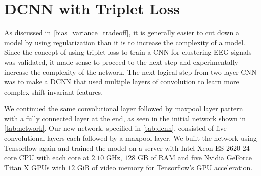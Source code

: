 \section{DCNN with Triplet Loss}

As discussed in \cref{bias_variance_tradeoff}, it is generally easier to cut down a model by using regularization than it is to increase the complexity of a model. Since the concept of using triplet loss to train a CNN for clustering EEG signals was validated, it made sense to proceed to the next step and experimentally increase the complexity of the network. The next logical step from two-layer CNN was to make a DCNN that used multiple layers of convolution to learn more complex shift-invariant features.

We continued the same convolutional layer followed by maxpool layer pattern with a fully connected layer at the end, as seen in the initial network shown in \cref{tab:network}. Our new network, specified in \cref{tab:dcnn}, consisted of five convolutional layers each followed by a maxpool layer. We built the network using Tensorflow again and trained the model on a server with Intel Xeon ES-2620 24-core CPU with each core at $2.10$ GHz, $128$ GB of RAM and five Nvidia GeForce Titan X GPUs with $12$ GiB of video memory for Tensorflow's GPU acceleration.

